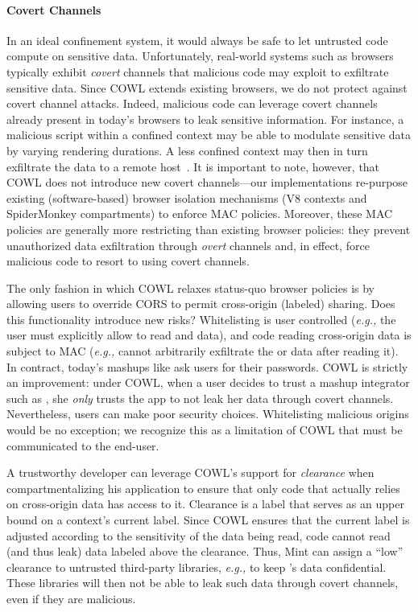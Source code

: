 \paragraph{Covert Channels}
In an ideal confinement system, it would always be safe to let untrusted
code compute on sensitive data.
%
Unfortunately, real-world systems such as browsers typically exhibit
\emph{covert} channels that malicious code may exploit to exfiltrate
sensitive data.
%
Since COWL extends existing browsers, we do not protect against covert
channel attacks.
%
Indeed, malicious code can leverage covert channels already present in
today's browsers to leak sensitive information.
%
For instance, a malicious script within a confined context may be able
to modulate sensitive data by varying rendering durations. A less
confined context may then in turn exfiltrate the data to a remote
host~\cite{kotcher2013cross}.
%
It is important to note, however, that COWL does not introduce new
covert channels---our implementations re-purpose existing
(software-based) browser isolation mechanisms (V8 contexts and
SpiderMonkey compartments) to enforce MAC policies.
%
Moreover, these MAC policies are generally more restricting than
existing browser policies: they prevent unauthorized data exfiltration
through \emph{overt} channels and, in effect, force malicious code to
resort to using covert channels.


The only fashion in which COWL relaxes status-quo browser policies is
by allowing users to override CORS to permit cross-origin (labeled)
sharing.
%
Does this functionality introduce new risks?
%
Whitelisting is user controlled (\emph{e.g.,} the user must explicitly
allow  to read  and
 data), and code reading cross-origin data is subject
to MAC (\emph{e.g.,}  cannot arbitrarily exfiltrate
the  or  data after reading it).
%
In contract, today's mashups like  ask users for their
passwords.
%
COWL is strictly an improvement: under
COWL, when a user decides to trust a mashup integrator such as
, she {\em only} trusts the app to not leak her data
through covert channels.
%
Nevertheless, users can make poor security choices. Whitelisting
malicious origins would be no exception; we recognize this as a
limitation of COWL that must be communicated to the
end-user.%

A trustworthy developer can leverage COWL's support for
\emph{clearance} when compartmentalizing his application to ensure
that only code that actually relies on cross-origin data has access to
it.
%
Clearance is a label that serves as an upper bound on a context's
current label. Since COWL ensures that the current label is adjusted
according to the sensitivity of the data being read, code cannot read
(and thus leak) data labeled above the clearance.
%
Thus, Mint can assign a ``low'' clearance to untrusted third-party
libraries, {\em e.g.,} to keep 's data confidential.
%
These libraries will then not be able to leak such data through covert
channels, even if they are malicious.

